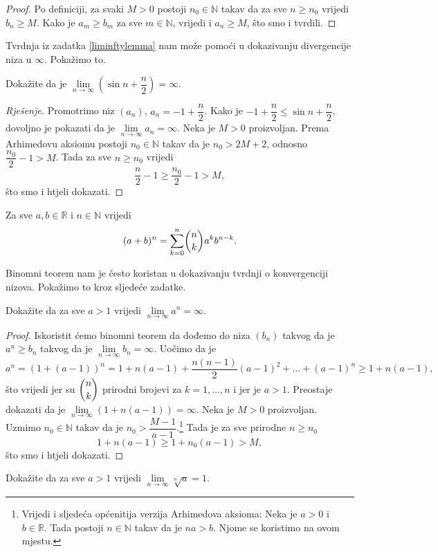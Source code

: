 \begin{proof}
Po definiciji, za svaki $M>0$ postoji $n_0\in \mathbb{N}$ takav da za sve $n\geq n_0$ vrijedi $b_n\geq M$. Kako je $a_m\geq b_m$ za sve $m\in \mathbb{N}$, vrijedi i $a_n\geq M$, što smo i tvrdili.
\end{proof}
Tvrdnja iz zadatka \ref{liminftylemma} nam može pomoći u dokazivanju divergencije niza u $\infty$. Pokažimo to.
\begin{exercise}
Dokažite da je $\lim\limits_{n\to \infty}\left(\sin{n}+\dfrac{n}{2}\right)=\infty$.
\end{exercise}
\begin{proof}[Rješenje]
Promotrimo niz $(a_n)$, $a_n=-1+\dfrac{n}{2}$. Kako je $-1+\dfrac{n}{2}\leq \sin{n}+\dfrac{n}{2}$, dovoljno je pokazati da je $\lim\limits_{n\to \infty}{a_n}=\infty$. Neka je $M>0$ proizvoljan. Prema Arhimedovu aksiomu postoji $n_0\in \mathbb{N}$ takav da je $n_0>2M+2$, odnosno $\dfrac{n_0}{2}-1>M$. Tada za sve $n\geq n_0$ vrijedi 
$$\dfrac{n}{2}-1\geq \dfrac{n_0}{2}-1>M,$$
što smo i htjeli dokazati.
\end{proof}
\begin{remark}
Za sve $a, b\in \mathbb{R}$ i $n\in \mathbb{N}$ vrijedi
$$(a+b)^n=\dsum_{k=0}^n{\binom{n}{k}a^kb^{n-k}}.$$
\end{remark}
Binomni teorem nam je često koristan u dokazivanju tvrdnji o konvergenciji nizova. Pokažimo to kroz sljedeće zadatke.
\begin{exercise}
\label{liman}
Dokažite da za sve $a>1$ vrijedi $\lim\limits_{n\to \infty}{a^n}=\infty$.
\end{exercise}
\begin{proof}
Iskoristit ćemo binomni teorem da dođemo do niza $(b_n)$ takvog da je $a^n\geq b_n$ takvog da je $\lim\limits_{n\to \infty}{b_n}=\infty$. Uočimo da je
$$a^n=(1+(a-1))^n=1+n(a-1)+\dfrac{n(n-1)}{2}(a-1)^2+\dots+(a-1)^n\geq 1+n(a-1),$$
što vrijedi jer su $\dbinom{n}{k}$ prirodni brojevi za $k=1,\dots, n$ i jer je $a>1$. Preostaje dokazati da je $\lim\limits_{n\to \infty}\left(1+n\left(a-1\right)\right)=\infty$. Neka je $M>0$ proizvoljan. Uzmimo $n_0\in \mathbb{N}$ takav da je $n_0>\dfrac{M-1}{a-1}$.\footnote{Vrijedi i sljedeća općenitija verzija Arhimedova aksioma: Neka je $a>0$ i $b\in \mathbb{R}$. Tada postoji $n\in \mathbb{N}$ takav da je $na>b$. Njome se koristimo na ovom mjestu.} Tada je za sve prirodne $n\geq n_0$
$$1+n(a-1)\geq 1+n_0(a-1)>M,$$
što smo i htjeli dokazati.
\end{proof}
\begin{exercise}
Dokažite da za sve $a>1$ vrijedi $\lim\limits_{n\to \infty}{\sqrt[n]{a}}=1$.
\end{exercise}
